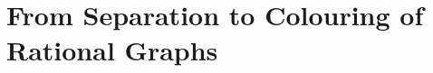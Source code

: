 \section{%
	\AP\label{sec:dichotomy-colouring}%
	From Separation to Colouring of Rational Graphs
}



